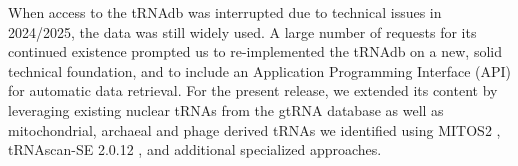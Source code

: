 \documentclass[unnumsec,webpdf,contemporary,large]{oup-authoring-template}
\begin{document}
When access to the tRNAdb was interrupted due to technical issues in
2024/2025, the data was still widely used. A large number of requests for
its continued existence prompted us to re-implemented the tRNAdb on a
new, solid technical foundation, and to include an Application Programming Interface (API) for automatic data
retrieval. For the present release, we extended its content by leveraging
existing nuclear tRNAs from the gtRNA database as well as mitochondrial,
archaeal and phage derived tRNAs we identified using MITOS2
\cite{mitos2}, tRNAscan-SE 2.0.12 \cite{tRNAscan}, and additional
specialized approaches.

    

\end{document}
